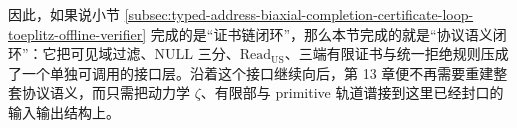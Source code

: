 因此，如果说小节 \ref{subsec:typed-address-biaxial-completion-certificate-loop-toeplitz-offline-verifier} 完成的是“证书链闭环”，那么本节完成的就是“协议语义闭环”：它把可见域过滤、\(\mathrm{NULL}\) 三分、\(\mathrm{Read}_{\mathrm{US}}\)、三端有限证书与统一拒绝规则压成了一个单独可调用的接口层。沿着这个接口继续向后，第 13 章便不再需要重建整套协议语义，而只需把动力学 \(\zeta\)、有限部与 primitive 轨道谱接到这里已经封口的输入输出结构上。
